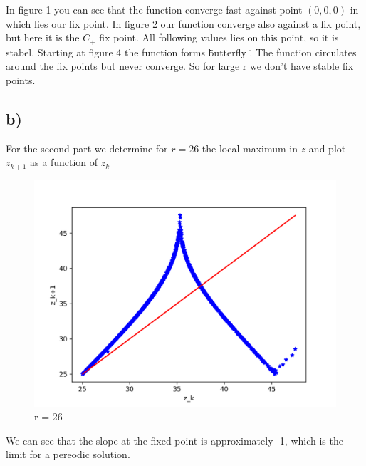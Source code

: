\documentclass[11pt, a4paper, reqno]{scrartcl}
\begin{document}
        In figure 1 you can see that the function converge fast against point $(0, 			0, 0)$ in which lies our fix point. In figure 2 our function converge also 			against a fix point, but here it is the $C_+$ fix point. All following 				values lies on this point, so it is stabel. Starting at figure 4 the 				function forms \" butterfly \". The function circulates around the fix 				points but never converge. So for large r we don't have stable fix points.
        
	\subsection*{b)}
		For the second part we determine for $r = 26$ the local maximum in $z$ and 			plot $z_{k + 1}$ as a function of $z_k$
		\begin{figure}[H]
     		
     	\end{figure}
		\begin{figure}[H]
     		
     	\end{figure}
     	\begin{figure}
     		\includegraphics[scale = 1]{z_k.png}
     		\caption{r = 26}
     	\end{figure}
     	
     	We can see that the slope at the fixed point is approximately -1, which is the limit for a pereodic solution. 
      
        
        
\end{document}
